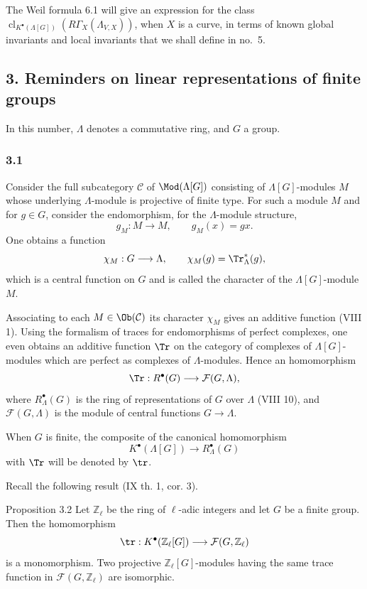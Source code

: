 The Weil formula 6.1 will give an expression for the class
$\operatorname{cl}_{K^\bullet(\Lambda[G])}(R\Gamma_X(\Lambda_{V,X}))$,
when $X$ is a curve, in terms of known global invariants and local invariants
that we shall define in no.~5.

\subsection*{3. Reminders on linear representations of finite groups}

In this number, $\Lambda$ denotes a commutative ring, and $G$ a group.

\subsubsection*{3.1}

Consider the full subcategory $\mathcal C$ of $\Mod(\Lambda[G])$ consisting of $\Lambda[G]$-modules $M$ whose underlying $\Lambda$-module is projective of finite type. For such a module $M$ and for $g\in G$, consider the endomorphism, for the $\Lambda$-module structure,
\[
g_M:M\longrightarrow M,
\qquad g_M(x)=gx.
\]
One obtains a function
\[
\chi_M:G\longrightarrow \Lambda,
\qquad \chi_M(g)=\Tr^*_\Lambda(g),
\]
which is a central function on $G$ and is called the character of the $\Lambda[G]$-module $M$.

Associating to each $M\in\Ob(\mathcal C)$ its character $\chi_M$ gives an additive function (VIII 1). Using the formalism of traces for endomorphisms of perfect complexes, one even obtains an additive function $\Tr$ on the category of complexes of $\Lambda[G]$-modules which are perfect as complexes of $\Lambda$-modules. Hence an homomorphism
\[
\Tr:R^{\bullet}(G)\longrightarrow \mathcal F(G,\Lambda),
\]
where $R^{\bullet}_{\Lambda}(G)$ is the ring of representations of $G$ over $\Lambda$ (VIII 10), and $\mathcal F(G,\Lambda)$ is the module of central functions $G\to\Lambda$.

When $G$ is finite, the composite of the canonical homomorphism
\[
K^{\bullet}(\Lambda[G])\longrightarrow R^{\bullet}_{\Lambda}(G)
\]
with $\Tr$ will be denoted by $\tr$.

Recall the following result (IX th. 1, cor. 3).

\begin{statement}{Proposition 3.2}
Let $\mathbb Z_\ell$ be the ring of $\ell$-adic integers and let $G$ be a finite group. Then the homomorphism
\[
\tr:K^{\bullet}(\mathbb Z_\ell[G])\longrightarrow \mathcal F(G,\mathbb Z_\ell)
\]
is a monomorphism. Two projective $\mathbb Z_\ell[G]$-modules having the same trace function in $\mathcal F(G,\mathbb Z_\ell)$ are isomorphic.
\end{statement}

